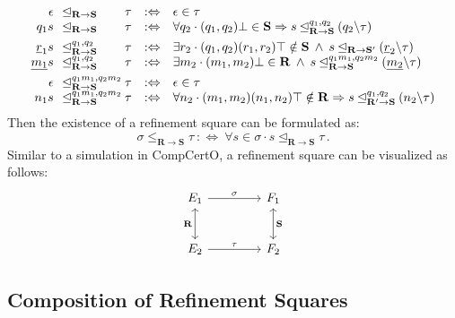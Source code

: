 \begin{definition}
\[\begin{array}{r@{\:\:\:}l@{\:}l@{\quad:\Leftrightarrow\quad}l}
      \epsilon &
      \unlhd_{\mathbf{R} \rightarrow \mathbf{S}} &
      \tau &
      \epsilon \in \tau
      \\
      q_1 s &
      \unlhd_{\mathbf{R} \rightarrow \mathbf{S}} &
      \tau &
      \forall q_2 \cdot
      (q_1, q_2)\bot \in \mathbf{S} \Rightarrow
      s \unlhd_{\mathbf{R} \rightarrow \mathbf{S}}^{q_1,q_2}
      (q_2 \backslash \tau)
      \\[1ex]
      \underline{r}_1 s &
      \unlhd_{\mathbf{R} \rightarrow \mathbf{S}}^{q_1,q_2} &
      \tau &
      \exists r_2 \cdot
      (q_1, q_2)(r_1, r_2)\top \notin \mathbf{S} \:\wedge\:
      s \unlhd_{\mathbf{R} \rightarrow \mathbf{S}'}
      (\underline{r}_2 \backslash \tau )
      \\
      \underline{m_1} s &
      \unlhd_{\mathbf{R} \rightarrow \mathbf{S}}^{q_1,q_2} &
      \tau &
      \exists m_2 \cdot
      (m_1, m_2) \bot \in \mathbf{R} \:\wedge\:
      s \unlhd_{\mathbf{R} \rightarrow \mathbf{S}}^{q_1m_1,q_2m_2}
      (\underline{m_2} \backslash \tau )
      \\[1ex]
      \epsilon &
      \unlhd_{\mathbf{R} \rightarrow \mathbf{S}}^{q_1m_1,q_2m_2} &
      \tau &
      \epsilon \in \tau
      \\
      n_1 s &
      \unlhd_{\mathbf{R} \rightarrow \mathbf{S}}^{q_1m_1,q_2m_2} &
      \tau &
      \forall n_2 \cdot
      (m_1,m_2)(n_1, n_2)\top \notin \mathbf{R} \Rightarrow
      s \unlhd_{\mathbf{R}' \rightarrow \mathbf{S}}^{q_1,q_2}
      (n_2 \backslash \tau)
    \end{array}
  \]
  Then the existence of a refinement square can be formulated as:
  \[
    \sigma \le_{\mathbf{R} \rightarrow \mathbf{S}} \tau
    \::\Leftrightarrow\:
    \forall s \in \sigma \cdot
    s \unlhd_{\mathbf{R} \rightarrow \mathbf{S}} \tau
    \,.
  \]
  Similar to a simulation in CompCertO,
  a refinement square can be visualized as follows:
  \[
    \begin{tikzcd}[sep=small]
      E_1 \ar[rr, "\sigma"] \ar[dd, leftrightarrow, "\mathbf{R}"'] && F_1
      \ar[dd, leftrightarrow, "\mathbf{S}"]
      \\
      & \quad & \\
      E_2 \ar[rr, "\tau"] && F_2
    \end{tikzcd}
  \]
\end{definition}

\subsection{Composition of Refinement Squares}


